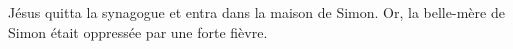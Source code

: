 \encetemps Jésus quitta la synagogue et entra dans la maison de Simon.
Or, la belle-mère de Simon était oppressée par une forte fièvre.
